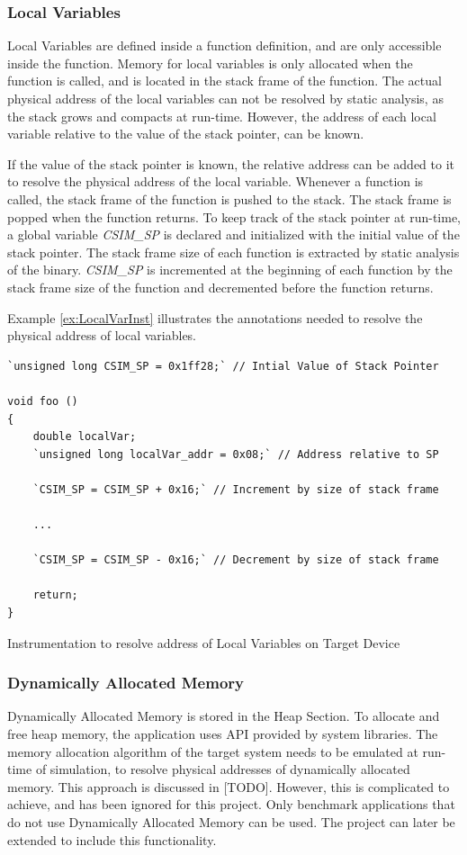 \subsubsection{Local Variables}
Local Variables are defined inside a function definition, and are only accessible inside the function. Memory for local variables is only allocated when the function is called, and is located in the stack frame of the function. The actual physical address of the local variables can not be resolved by static analysis, as the stack grows and compacts at run-time. However, the address of each local variable relative to the value of the stack pointer, can be known.

If the value of the stack pointer is known, the relative address can be added to it to resolve the physical address of the local variable. Whenever a function is called, the stack frame of the function is pushed to the stack. The stack frame is popped when the function returns. To keep track of the stack pointer at run-time, a global variable \emph{CSIM\_SP} is declared and initialized with the initial value of the stack pointer. The stack frame size of each function is extracted by static analysis of the binary. \emph{CSIM\_SP} is incremented at the beginning of each function by the stack frame size of the function and decremented before the function returns.

Example \ref{ex:LocalVarInst} illustrates the annotations needed to resolve the physical address of local variables.

\vspace*{10pt}
\begin{Example}
\begin{lstlisting}[label=lst:LocalVarInst]
`unsigned long CSIM_SP = 0x1ff28;` // Intial Value of Stack Pointer

void foo ()
{
    double localVar;
    `unsigned long localVar_addr = 0x08;` // Address relative to SP

    `CSIM_SP = CSIM_SP + 0x16;` // Increment by size of stack frame
    
    ...
    
    `CSIM_SP = CSIM_SP - 0x16;` // Decrement by size of stack frame
    
    return;
}
\end{lstlisting}
\caption{Instrumentation to resolve address of Local Variables on Target Device}
\label{ex:LocalVarInst}
\end{Example}

\subsubsection{Dynamically Allocated Memory}
Dynamically Allocated Memory is stored in the Heap Section. To allocate and free heap memory, the application uses API provided by system libraries. The memory allocation algorithm of the target system needs to be emulated at run-time of simulation, to resolve physical addresses of dynamically allocated memory. This approach is discussed in [TODO]. However, this is complicated to achieve, and has been ignored for this project. Only benchmark applications that do not use Dynamically Allocated Memory can be used. The project can later be extended to include this functionality.

